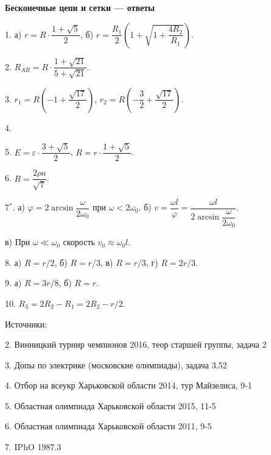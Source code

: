 \documentclass[14pt]{article}
\begin{document}
\begin{center}
\Large{\textbf{Бесконечные цепи и сетки --- ответы}}
\end{center}

\vspace{5mm}

1. а) $r=R\cdot\dfrac{1+\sqrt5}{2}$,\hspace{5cm} б) $r=\dfrac{R_1}{2}\left(1+\sqrt{1+\dfrac{4R_2}{R_1}}\right)$.

2. $R_{AB}=R\cdot\dfrac{1+\sqrt{21}}{5+\sqrt{21}}$.

3. $r_1=R\left(-1+\dfrac{\sqrt{17}}{2}\right)$, $r_2=R\left(-\dfrac{3}{2}+\dfrac{\sqrt{17}}{2}\right)$.

4. 

5. $E=\varepsilon\cdot\dfrac{3+\sqrt{5}}{2}$, $R=r\cdot\dfrac{1+\sqrt5}{2}$.

6. $R=\dfrac{2\rho a}{\sqrt7}$.

7$^*$. а) $\varphi=2\arcsin\dfrac{\omega}{2\omega_0}$ при $\omega<2\omega_0$.
\hspace{3cm}
б) $v=\dfrac{\omega l}{\varphi}=\dfrac{\omega l}{2\arcsin\dfrac{\omega}{2\omega_0}}$.

в) При $\omega\ll \omega_0$ скорость $v_0\approx \omega_0 l$.

8. а) $R=r/2$,
\hspace{2cm}
б) $R=r/3$,
\hspace{2cm}
в) $R=r/3$,
\hspace{2cm}
г) $R=2r/3$.

9. а) $R=3r/8$,
\hspace{5cm}
б) $R=r$.

10. $R_3=2R_2-R_1=2R_2-r/2$.

Источники:

2. Винницкий турнир чемпионов 2016, теор старшей группы, задача 2

3. Допы по электрике (московские олимпиады), задача 3.52

4. Отбор на всеукр Харьковской области 2014, тур Майзелиса, 9-1

5. Областная олимпиада Харьковской области 2015, 11-5

6. Областная олимпиада Харьковской области 2011, 9-5

7. IPhO 1987.3
\end{document}
